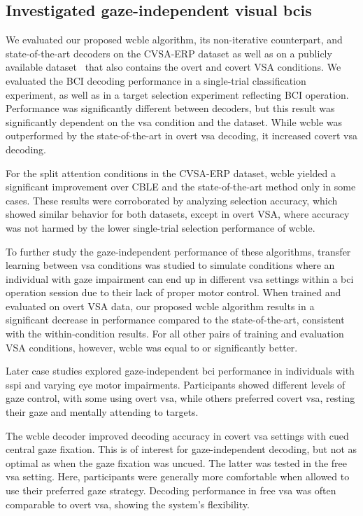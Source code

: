\subsection{Investigated gaze-independent visual \acsp{bci}}

We evaluated our proposed \ac{wcble} algorithm, its non-iterative
counterpart, and state-of-the-art decoders on the CVSA-ERP dataset as well as on a publicly available
dataset~\cite{Aloise2012} that also contains the overt and covert VSA conditions.
We evaluated the BCI decoding performance in a single-trial classification experiment,
as well as in a target selection experiment reflecting BCI operation.
Performance was significantly different between decoders, but this
result was significantly dependent on the \ac{vsa} condition and the dataset.
While \ac{wcble} was outperformed by the state-of-the-art in overt \ac{vsa}
decoding, it increased covert \ac{vsa} decoding.

For the split attention conditions in the CVSA-ERP
dataset, \ac{wcble} yielded a significant improvement over CBLE and the
state-of-the-art method only in some cases.
These results were corroborated by analyzing selection accuracy, which showed
similar behavior for both datasets, except in overt
VSA, where accuracy was not harmed by the lower
single-trial selection performance of \ac{wcble}.

To further study the gaze-independent performance of these algorithms, transfer
learning between \ac{vsa} conditions was studied to simulate conditions where an
individual with gaze impairment can end up in different \ac{vsa} settings within
a \ac{bci} operation session due to their lack of proper motor control.
When trained and evaluated on overt VSA data, our proposed \ac{wcble} algorithm
results in a significant decrease in performance compared to the state-of-the-art,
consistent with the within-condition results.
For all other pairs of training and evaluation VSA conditions, however,
\ac{wcble} was equal to or significantly better.

Later case studies explored gaze-independent
\ac{bci} performance in individuals with \ac{sspi} and varying eye motor impairments.
Participants showed different levels of gaze control, with some using overt
\ac{vsa}, while others preferred covert \ac{vsa}, resting their gaze and
mentally attending to targets.

The \ac{wcble} decoder improved decoding accuracy in covert
\ac{vsa} settings with cued central gaze fixation.
This is of interest for gaze-independent decoding, but not as optimal as when the
gaze fixation was uncued.
The latter was tested in the free \ac{vsa} setting.
Here, participants were generally more comfortable when allowed to use their
preferred gaze strategy.
Decoding performance in free \ac{vsa} was often comparable to overt \ac{vsa},
showing the system's flexibility.


